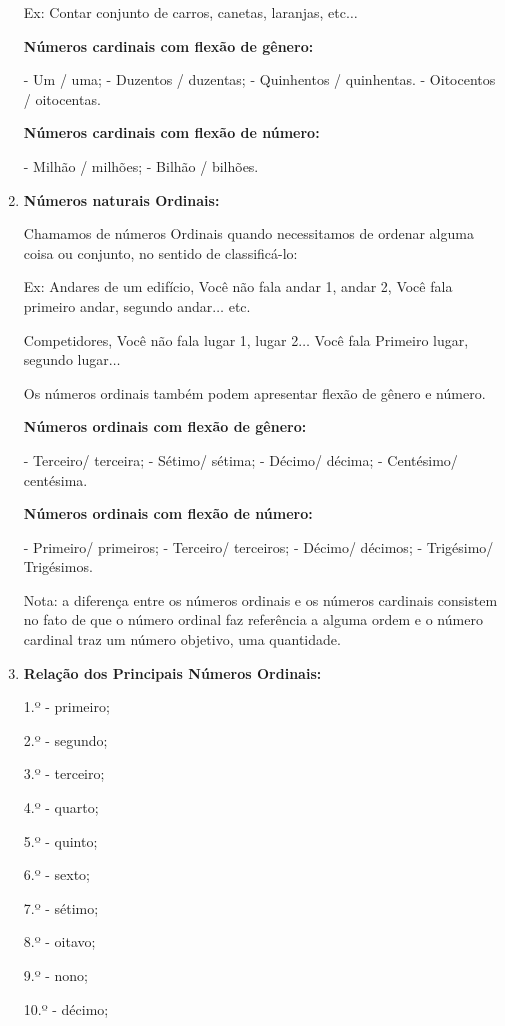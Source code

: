 \begin{multicols*}{2}
\begin{enumerate}
		Ex:  Contar conjunto de carros, canetas, laranjas, etc$\dots$
		
		\textbf{Números cardinais com flexão de gênero:}

		- Um / uma;
		- Duzentos / duzentas;
		- Quinhentos / quinhentas.
		- Oitocentos / oitocentas.

		\textbf{Números cardinais com flexão de número:}

		- Milhão / milhões;
		- Bilhão / bilhões.
		
		\item \textbf{Números naturais Ordinais:}
		
		Chamamos de números Ordinais quando necessitamos de ordenar alguma coisa ou conjunto, no sentido de classificá-lo:
		
		Ex: 	Andares de um edifício, Você não fala andar 1, andar 2, Você fala primeiro andar, segundo andar$\dots$ etc.
		
				Competidores, Você não fala lugar 1, lugar 2$\dots$ Você fala Primeiro lugar, segundo lugar$\dots$
				
				Os números ordinais também podem apresentar flexão de gênero e número.

				\textbf{Números ordinais com flexão de gênero:}

				- Terceiro/ terceira;
				- Sétimo/ sétima;
				- Décimo/ décima;
				- Centésimo/ centésima.

				\textbf{Números ordinais com flexão de número:}

				- Primeiro/ primeiros;
				- Terceiro/ terceiros;
				- Décimo/ décimos;
				- Trigésimo/ Trigésimos.

Nota: a diferença entre os números ordinais e os números cardinais consistem no fato de que o número ordinal faz referência a alguma ordem e o número cardinal traz um número objetivo, uma quantidade.

		\item \textbf{Relação dos Principais Números Ordinais:}
		
1.º - primeiro;

2.º - segundo;

3.º - terceiro;

4.º - quarto;

5.º - quinto;

6.º - sexto;

7.º - sétimo;

8.º - oitavo;

9.º - nono;

10.º - décimo;


\end{enumerate}
\end{multicols*}

